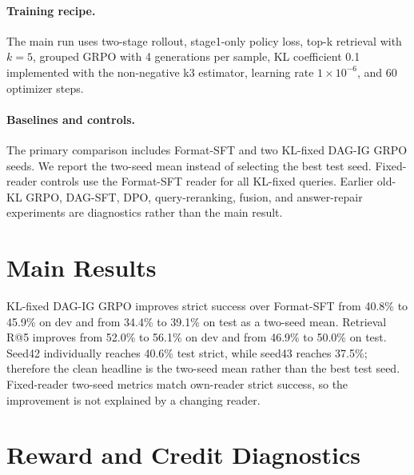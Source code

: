 \paragraph{Training recipe.}
The main run uses two-stage rollout, stage1-only policy loss, top-k retrieval with \(k=5\), grouped GRPO with 4 generations per sample, KL coefficient 0.1 implemented with the non-negative k3 estimator, learning rate \(1\times10^{-6}\), and 60 optimizer steps.

\paragraph{Baselines and controls.}
The primary comparison includes Format-SFT and two KL-fixed DAG-IG GRPO seeds. We report the two-seed mean instead of selecting the best test seed. Fixed-reader controls use the Format-SFT reader for all KL-fixed queries. Earlier old-KL GRPO, DAG-SFT, DPO, query-reranking, fusion, and answer-repair experiments are diagnostics rather than the main result.

\section{Main Results}

\begin{table}[t]
\centering

\caption{Main two-stage offline Pix2Fact results. Strict success requires answer correctness and evidence support.}
\label{tab:main}
\end{table}

KL-fixed DAG-IG GRPO improves strict success over Format-SFT from 40.8\% to 45.9\% on dev and from 34.4\% to 39.1\% on test as a two-seed mean. Retrieval R@5 improves from 52.0\% to 56.1\% on dev and from 46.9\% to 50.0\% on test. Seed42 individually reaches 40.6\% test strict, while seed43 reaches 37.5\%; therefore the clean headline is the two-seed mean rather than the best test seed. Fixed-reader two-seed metrics match own-reader strict success, so the improvement is not explained by a changing reader.

\section{Reward and Credit Diagnostics}

\begin{table}[t]
\centering

\caption{Reward audit over GRPO rollout groups. DAG-IG reward is predictive of retrieval hit and strict success, and constant-reward groups are rare.}
\label{tab:reward}
\end{table}

